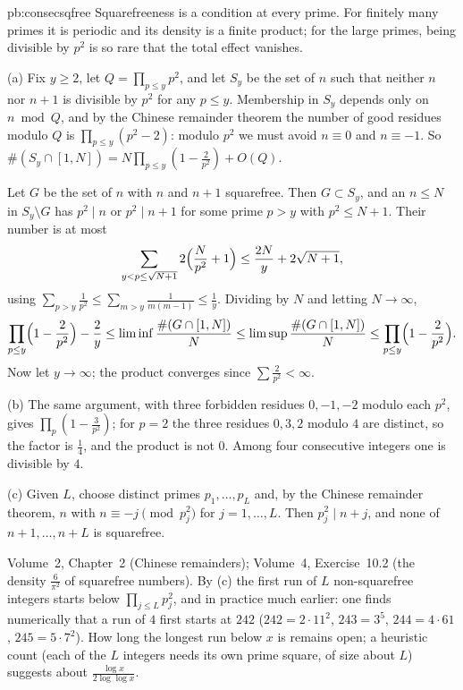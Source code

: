 \begin{solution}{pb:consecsqfree}
\idea Squarefreeness is a condition at every prime. For finitely many primes it is periodic and its density is a finite
product; for the large primes, being divisible by $p^2$ is so rare that the total effect vanishes.

\writeup (a) Fix $y\ge2$, let $Q=\prod_{p\le y}p^2$, and let $S_y$ be the set of $n$ such that neither $n$ nor $n+1$ is divisible by
$p^2$ for any $p\le y$. Membership in $S_y$ depends only on $n\bmod Q$, and by the Chinese remainder theorem the number of good
residues modulo $Q$ is $\prod_{p\le y}(p^2-2)$: modulo $p^2$ we must avoid $n\equiv0$ and $n\equiv-1$. So
$\#(S_y\cap[1,N])=N\prod_{p\le y}(1-\frac2{p^2})+O(Q)$.

Let $G$ be the set of $n$ with $n$ and $n+1$ squarefree. Then $G\subset S_y$, and an $n\le N$ in $S_y\setminus G$ has $p^2\mid n$ or
$p^2\mid n+1$ for some prime $p>y$ with $p^2\le N+1$. Their number is at most
\[
\sum_{y<p\le\sqrt{N+1}}2\Bigl(\frac N{p^2}+1\Bigr)\le\frac{2N}y+2\sqrt{N+1},
\]
using $\sum_{p>y}\frac1{p^2}\le\sum_{m>y}\frac1{m(m-1)}\le\frac1y$. Dividing by $N$ and letting $N\to\infty$,
\[
\prod_{p\le y}\Bigl(1-\frac2{p^2}\Bigr)-\frac2y\le\liminf\frac{\#(G\cap[1,N])}N\le\limsup\frac{\#(G\cap[1,N])}N\le\prod_{p\le y}\Bigl(1-\frac2{p^2}\Bigr).
\]
Now let $y\to\infty$; the product converges since $\sum\frac2{p^2}<\infty$.

(b) The same argument, with three forbidden residues $0,-1,-2$ modulo each $p^2$, gives $\prod_p(1-\frac3{p^2})$; for $p=2$ the
three residues $0,3,2$ modulo $4$ are distinct, so the factor is $\frac14$, and the product is not $0$. Among four consecutive
integers one is divisible by $4$.

(c) Given $L$, choose distinct primes $p_1,\dots,p_L$ and, by the Chinese remainder theorem, $n$ with $n\equiv-j\pmod{p_j^2}$ for
$j=1,\dots,L$. Then $p_j^2\mid n+j$, and none of $n+1,\dots,n+L$ is squarefree.

\tools Volume~2, Chapter~2 (Chinese remainders); Volume~4, Exercise~10.2 (the density $\frac6{\pi^2}$ of squarefree numbers).
\leads By (c) the first run of $L$ non-squarefree integers starts below $\prod_{j\le L}p_j^2$, and in practice much
earlier: one finds numerically that a run of $4$ first starts at $242$ ($242=2\cdot11^2$, $243=3^5$, $244=4\cdot61$, $245=5\cdot7^2$).
How long the longest run below $x$ is remains open; a heuristic count (each of the $L$ integers needs its own prime square,
of size about $L$) suggests about $\frac{\log x}{2\log\log x}$.
\end{solution}

